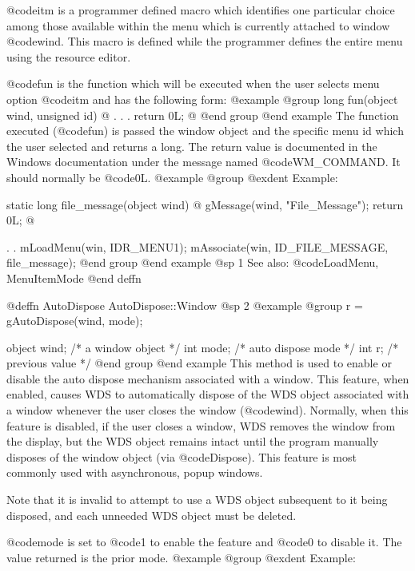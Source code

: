 @code{itm} is a programmer defined macro which identifies one particular
choice among those available within the menu which is currently attached
to window @code{wind}.  This macro is defined while the programmer defines
the entire menu using the resource editor.

@code{fun} is the function which will be executed when the user selects
menu option @code{itm} and has the following form:
@example
@group
long    fun(object wind, unsigned id)
@{
        .
        .
        .
        return 0L;
@}
@end group
@end example
The function executed (@code{fun}) is passed the window object and
the specific menu id which the user selected and
returns a long.  The return value is documented in the Windows documentation
under the message named @code{WM_COMMAND}.  It should normally be @code{0L}.
@example
@group
@exdent Example:

static  long    file_message(object wind)
@{
        gMessage(wind, "File_Message");
        return 0L;
@}

        .
        .
        mLoadMenu(win, IDR_MENU1);
        mAssociate(win, ID_FILE_MESSAGE, file_message);
@end group
@end example
@sp 1
See also:  @code{LoadMenu, MenuItemMode}
@end deffn











@deffn {AutoDispose} AutoDispose::Window
@sp 2
@example
@group
r = gAutoDispose(wind, mode);

object   wind;     /*  a window object    */
int      mode;     /*  auto dispose mode  */
int      r;        /*  previous value     */
@end group
@end example
This method is used to enable or disable the auto dispose mechanism
associated with a window.  This feature, when enabled, causes WDS to
automatically dispose of the WDS object associated with a window
whenever the user closes the window (@code{wind}).  Normally, when
this feature is disabled, if the user closes a window, WDS removes
the window from the display, but the WDS object remains intact until
the program manually disposes of the window object (via @code{Dispose}).
This feature is most commonly used with asynchronous, popup windows.

Note that it is invalid to attempt to use a WDS object subsequent to it
being disposed, and each unneeded WDS object must be deleted.

@code{mode} is set to @code{1} to enable the feature and @code{0}
to disable it.  The value returned is the prior mode.
@example
@group
@exdent Example:

